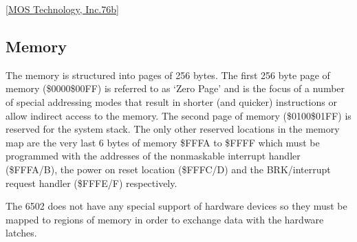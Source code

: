 \documentclass[letterpaper,10pt,english]{sphinxmanual}
\begin{document}
\sphinxAtStartPar
{[}\hyperlink{cite.index:id15}{MOS Technology, Inc.76b}{]}


\subsection{Memory}
\label{\detokenize{core_6502:memory}}
\sphinxAtStartPar
The memory is structured into pages of 256 bytes. The first 256 byte page of
memory (\$0000\sphinxhyphen{}\$00FF) is referred to as ‘Zero Page’ and is the focus of a number
of special addressing modes that result in shorter (and quicker) instructions or
allow indirect access to the memory. The second page of memory (\$0100\sphinxhyphen{}\$01FF) is
reserved for the system stack. The only other reserved locations in the memory
map are the very last 6 bytes of memory \$FFFA to \$FFFF which must be programmed
with the addresses of the non\sphinxhyphen{}maskable interrupt handler (\$FFFA/B), the power on
reset location (\$FFFC/D) and the BRK/interrupt request handler (\$FFFE/F)
respectively.

\sphinxAtStartPar
The 6502 does not have any special support of hardware devices so they must be
mapped to regions of memory in order to exchange data with the hardware latches.
\end{document}
